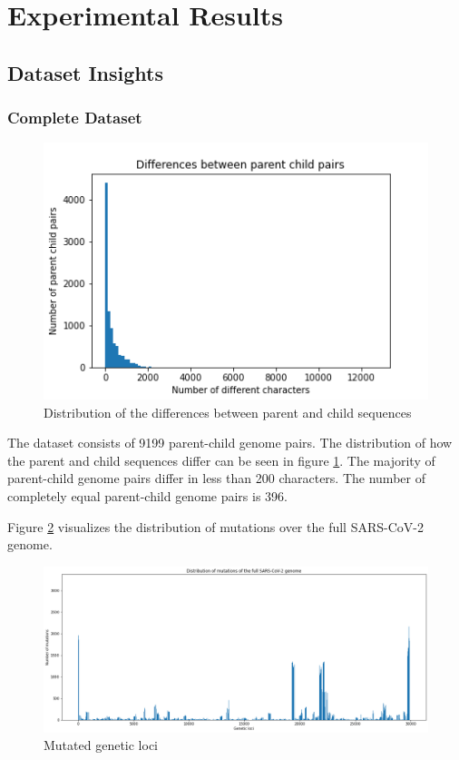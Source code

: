 \section{Experimental Results} \label{experiments}

\subsection{Dataset Insights} \label{experimentsA}

\subsubsection{Complete Dataset} \label{experimentsAa}

\begin{figure}
	\centering
	\includegraphics[width=0.9\linewidth]{figures/distributionDifferencesParentChild.png}
	\caption{Distribution of the differences between parent and child sequences \cite{own representation}}
	\label{distributionDifferencesParentChild}
\end{figure}

The dataset consists of 9199 parent-child genome pairs. The distribution of how the parent and child sequences differ can be seen in figure \ref{distributionDifferencesParentChild}. The majority of parent-child genome pairs differ in less than 200 characters. The number of completely equal parent-child genome pairs is 396.

\vspace{2cm}
Figure \ref{mutatedGeneticLoci} visualizes the distribution of mutations over the full \ac{SARS-CoV-2} genome.

\begin{figure}[ht!]
	\centering
	\includegraphics[width=1.0\linewidth]{figures/mutatedGeneticLoci.png}
	\caption{Mutated genetic loci \cite{own representation}}
	\label{mutatedGeneticLoci}
\end{figure}

